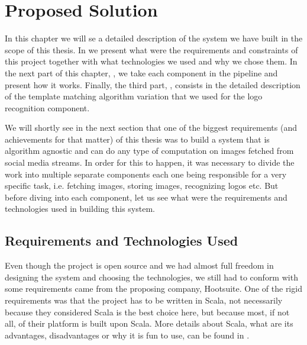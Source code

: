 \chapter{Proposed Solution}
\label{chapter:proposed-sol}

In this chapter we will se a detailed description of the system we have built
in the scope of this thesis. In  we
present what were the requirements and constraints of this project together
with what technologies we used and why we chose them. In the next part of this
chapter, , we take each component in the
pipeline and present how it works. Finally, the third part,
, consists in the detailed description of
the template matching algorithm variation that we used for the logo
recognition component.

We will shortly see in the next section that one of the biggest requirements
(and achievements for that matter) of this thesis was to build a system that
is algorithm agnostic and can do any type of computation on images fetched
from social media streams. In order for this to happen, it was necessary to
divide the work into multiple separate components each one being responsible
for a very specific task, i.e. fetching images, storing images, recognizing
logos etc. But before diving into each component, let us see what were the
requirements and technologies used in building this system.

\section{Requirements and Technologies Used}
\label{sec:reqs-tech}

Even though the project is open source and we had almost full freedom in
designing the system and choosing the technologies, we still had to conform
with some requirements came from the proposing company, Hootsuite. One of the
rigid requirements was that the project has to be written in Scala, not
necessarily because they considered Scala is the best choice here, but because
most, if not all, of their platform is built upon Scala. More details about
Scala, what are its advantages, disadvantages or why it is fun to use, can be
found in .

